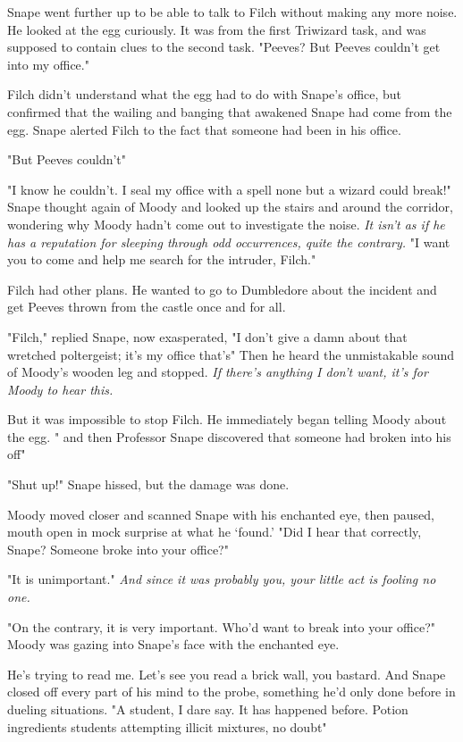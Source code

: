 Snape went further up to be able to talk to Filch without making any more noise. He looked at the egg curiously. It was from the first Triwizard task, and was supposed to contain clues to the second task. "Peeves? But Peeves couldn't get into my office."

Filch didn't understand what the egg had to do with Snape's office, but confirmed that the wailing and banging that awakened Snape had come from the egg. Snape alerted Filch to the fact that someone had been in his office.

"But Peeves couldn't{\el}"

"I know he couldn't. I seal my office with a spell none but a wizard could break!" Snape thought again of Moody and looked up the stairs and around the corridor, wondering why Moody hadn't come out to investigate the noise. \emph{It isn't as if he has a reputation for sleeping through odd occurrences, quite the contrary.} "I want you to come and help me search for the intruder, Filch."

Filch had other plans. He wanted to go to Dumbledore about the incident and get Peeves thrown from the castle once and for all.

"Filch," replied Snape, now exasperated, "I don't give a damn about that wretched poltergeist; it's my office that's{\el}" Then he heard the unmistakable sound of Moody's wooden leg and stopped. \emph{If there's anything I don't want, it's for Moody to hear this.}

But it was impossible to stop Filch. He immediately began telling Moody about the egg. "{\el} and then Professor Snape discovered that someone had broken into his off{\el}"

"Shut up!" Snape hissed, but the damage was done.

Moody moved closer and scanned Snape with his enchanted eye, then paused, mouth open in mock surprise at what he `found.' "Did I hear that correctly, Snape? Someone broke into your office?"

"It is unimportant." \emph{And since it was probably you, your little act is fooling no one.}

"On the contrary, it is very important. Who'd want to break into your office?" Moody was gazing into Snape's face with the enchanted eye.

He's trying to read me. Let's see you read a brick wall, you bastard. And Snape closed off every part of his mind to the probe, something he'd only done before in dueling situations. "A student, I dare say. It has happened before. Potion ingredients{\el} students attempting illicit mixtures, no doubt{\el}"

